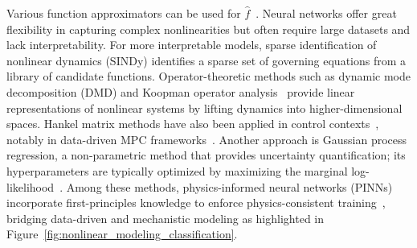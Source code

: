 Various function approximators can be used for $\hat{f}$~\cite{brunton2025machine}. Neural networks offer great flexibility in capturing complex nonlinearities but often require large datasets and lack interpretability. For more interpretable models, sparse identification of nonlinear dynamics (SINDy)\cite{fasel2021sindy} identifies a sparse set of governing equations from a library of candidate functions. Operator-theoretic methods such as dynamic mode decomposition (DMD)\cite{schmid2010dynamic} and Koopman operator analysis~\cite{mezic2005spectral} provide linear representations of nonlinear systems by lifting dynamics into higher-dimensional spaces. Hankel matrix methods have also been applied in control contexts~\cite{willems2005note}, notably in data-driven MPC frameworks~\cite{berberich2020data}. Another approach is Gaussian process regression, a non-parametric method that provides uncertainty quantification; its hyperparameters are typically optimized by maximizing the marginal log-likelihood~\cite{rasmussen_gaussian_2008}. Among these methods, physics-informed neural networks (PINNs) incorporate first-principles knowledge to enforce physics-consistent training~\cite{raissi2019physics}, bridging data-driven and mechanistic modeling as highlighted in Figure~\ref{fig:nonlinear_modeling_classification}.






